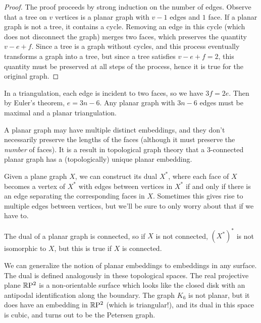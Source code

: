 
\begin{proof}
	
	The proof proceeds by strong induction on the number of edges. Observe that a tree on $v$ vertices is a planar graph with $v-1$ edges and $1$ face.  If a planar graph is not a tree, it contains a cycle.  Removing an edge in this cycle (which does not disconnect the graph) merges two faces, which preserves the quantity $v-e+f$.  Since a tree is a graph without cycles, and this process eventually transforms a graph into a tree, but since a tree satisfies $v-e+f=2$, this quantity must be preserved at all steps of the process, hence it is true for the original graph.
	
	
\end{proof}


In a triangulation, each edge is incident to two faces, so we have $3f=2e$.  Then by Euler's theorem, $e=3n-6$.  Any planar graph with $3n-6$ edges must be maximal and a planar triangulation.

A planar graph may have multiple distinct embeddings, and they don't necessarily preserve the lengths of the faces (although it must preserve the \textit{number} of faces).  It is a result in topological graph theory that a $3$-connected planar graph has a (topologically) unique planar embedding.

Given a plane graph $X$, we can construct its dual $X^*$, where each face of $X$ becomes a vertex of $X^*$ with edges between vertices in $X^*$ if and only if there is an edge separating the corresponding faces in $X$.  Sometimes this gives rise to multiple edges between vertices, but we'll be sure to only worry about that if we have to.

The dual of a planar graph is connected, so if $X$ is not connected, $(X^*)^*$ is not isomorphic to $X$, but this is true if $X$ is connected.

We can generalize the notion of planar embeddings to embeddings in any surface.  The  dual is defined analogously in these topological spaces.  The real projective plane $\mathbb{R}\mathrm{P}^2$ is a non-orientable surface which looks like the closed disk with an antipodal identification along the boundary.  The graph $K_6$ is not planar, but it does have an embedding in $\mathbb{R}\mathrm{P}^2$ (which is triangular!), and its dual in this space is cubic, and turns out to be the Petersen graph.

